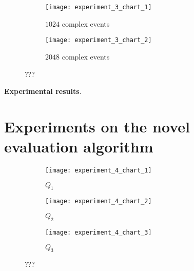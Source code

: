 \begin{figure}[H]
     \begin{adjustbox}{max width=1.2\linewidth,center}
     \centering
     \begin{subfigure}[b]{0.7\textwidth}
         \centering
         \texttt{[image: experiment\_3\_chart\_1]}
         \caption{$1024$ complex events}
         \label{fig:experiment:3:subfigure:1}
     \end{subfigure}
     \begin{subfigure}[b]{0.7\textwidth}
         \centering
         \texttt{[image: experiment\_3\_chart\_2]}
         \caption{$2048$ complex events}
         \label{fig:experiment:3:subfigure:1}
     \end{subfigure}
     \end{adjustbox}
     \caption{???}
     \label{fig:experiment:3:2}
\end{figure}

\textbf{Experimental results}.

\section{Experiments on the novel evaluation algorithm}\label{sec:new-algorithm}

\begin{figure}[H]
     \begin{adjustbox}{max width=1.5\linewidth,center}
     \centering
     \begin{subfigure}[b]{0.45\textwidth}
         \centering
         \texttt{[image: experiment\_4\_chart\_1]}
         \caption{$Q_{1}$}
         \label{fig:experiment:4:subfigure:1}
     \end{subfigure}
     \begin{subfigure}[b]{0.45\textwidth}
         \centering
         \texttt{[image: experiment\_4\_chart\_2]}
         \caption{$Q_{2}$}
         \label{fig:experiment:4:subfigure:2}
     \end{subfigure}
     \begin{subfigure}[b]{0.45\textwidth}
         \centering
         \texttt{[image: experiment\_4\_chart\_3]}
         \caption{$Q_{3}$}
         \label{fig:experiment:4:subfigure:3}
     \end{subfigure}
     \end{adjustbox}
     \caption{???}
     \label{fig:experiment:4}
\end{figure}



